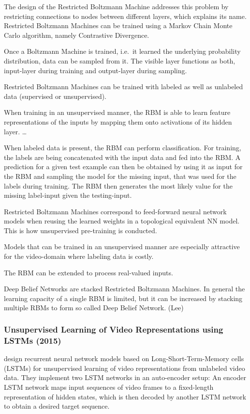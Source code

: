 The design of the Restricted Boltzmann Machine addresses this problem by restricting connections to nodes between different layers, which explains its name.
Restricted Boltzmann Machines can be trained using a Markov Chain Monte Carlo algorithm, namely Contrastive Divergence.

Once a Boltzmann Machine is trained, i.e.\ it learned the underlying probability distribution, data can be sampled from it.
The visible layer functions as both, input-layer during training and output-layer during sampling.

Restricted Boltzmann Machines can be trained with labeled as well as unlabeled data (supervised or unsupervised).

When training in an unsupervised manner, the RBM is able to learn feature representations of the inputs by mapping them onto activations of its hidden layer.
\ldots

When labeled data is present, the RBM can perform classification. 
For training, the labels are being concatenated with the input data and fed into the RBM.
A prediction for a given test example can then be obtained by using it as input for the RBM and sampling the model for the missing input, that was used for the labels during training.
The RBM then generates the most likely value for the missing label-input given the testing-input.

Restricted Boltzmann Machines correspond to feed-forward neural network models when reusing the learned weights in a topological equivalent NN model.
This is how unsupervised pre-training is conducted.

Models that can be trained in an unsupervised manner are especially attractive for the video-domain where labeling data is costly.

The RBM can be extended to process real-valued inputs.

Deep Belief Networks are stacked Restricted Boltzmann Machines.
In general the learning capacity of a single RBM is limited, but it can be increased by stacking multiple RBMs to form so called Deep Belief Network. (Lee)

\subsubsection{Unsupervised Learning of Video Representations using LSTMs (2015)}
\textcite{srivastava_unsupervised_2015} design recurrent neural network models based on Long-Short-Term-Memory cells (LSTMs) \cite{hochreiter_long_1997} for unsupervised learning of video representations from unlabeled video data.
They implement two LSTM networks in an auto-encoder setup: An encoder LSTM network maps input sequences of video frames to a fixed-length representation of hidden states, which is then decoded by another LSTM network to obtain a desired target sequence.

